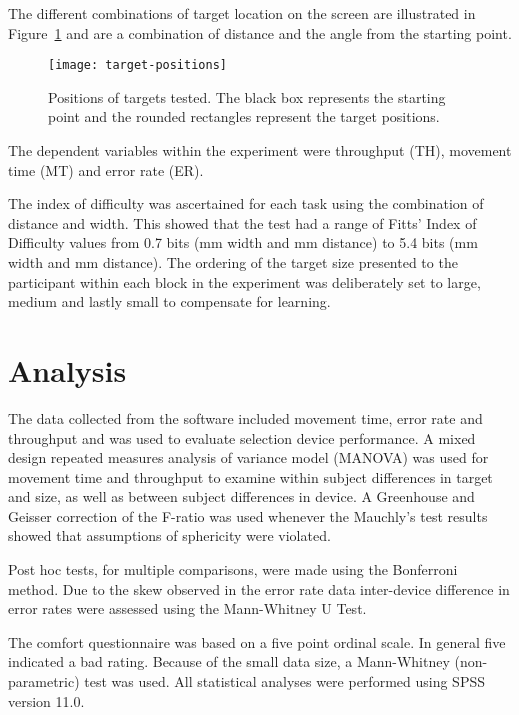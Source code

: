 \documentclass{elsart}
\begin{document}
The different combinations of target location on the screen are
illustrated in Figure~\ref{fig-target-positions} and are a combination
of distance and the angle from the starting point.

\begin{figure}
	\centering
	\texttt{[image: target-positions]}
	\caption{Positions of targets tested. The black box represents the
	starting point and the rounded rectangles represent the target
	positions.}
	\label{fig-target-positions}
\end{figure}


The dependent variables within the experiment were throughput (TH),
movement time (MT) and error rate (ER).

The index of difficulty was ascertained for each task using the
combination of distance and width. This showed that the test had a range
of Fitts' Index of Difficulty values from 0.7 bits (\unit[63]{mm} width
and \unit[160]{mm} distance) to 5.4 bits (\unit[4]{mm} width and
\unit[40]{mm} distance). The ordering of the target size presented to
the participant within each block in the experiment was deliberately set
to large, medium and lastly small to compensate for learning.

\section{Analysis}
\label{sec-analysis}

The data collected from the software included movement time, error rate
and throughput and was used to evaluate selection device performance. A
mixed design repeated measures analysis of variance model (MANOVA) was
used for movement time and throughput to examine within subject
differences in target and size, as well as between subject differences
in device. A Greenhouse and Geisser correction of the F-ratio was used
whenever the Mauchly's test results showed that assumptions of
sphericity were violated.

Post hoc tests, for multiple comparisons, were made using the Bonferroni
method. Due to the skew observed in the error rate data inter-device
difference in error rates were assessed using the Mann-Whitney U Test.

The comfort questionnaire was based on a five point ordinal scale. In
general five indicated a bad rating. Because of the small data size, a
Mann-Whitney (non-parametric) test was used. All statistical analyses
were performed using SPSS version 11.0.
\end{document}
